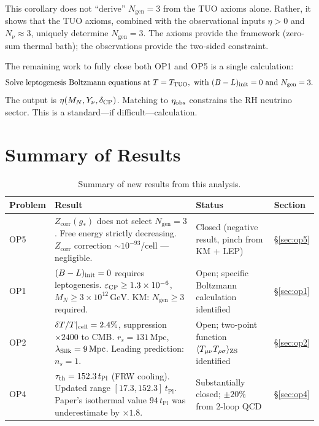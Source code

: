 \documentclass[12pt,a4paper]{article}
\theoremstyle{definition}
\newcommand{\tPl}{t_{\mathrm{Pl}}}
\newcommand{\TTUO}{T_{\mathrm{TUO}}}
\newcommand{\Ngen}{N_{\mathrm{gen}}}
\newcommand{\Zcorr}{Z_{\mathrm{corr}}}
\newcommand{\eps}{\varepsilon}
\begin{document}
This corollary does not ``derive'' $\Ngen = 3$ from the TUO axioms alone.
Rather, it shows that the TUO axioms, combined with the observational
inputs $\eta > 0$ and $N_\nu \approx 3$, uniquely determine $\Ngen = 3$.
The axioms provide the framework (zero-sum thermal bath); the observations
provide the two-sided constraint.

The remaining work to fully close both OP1 and OP5 is a single calculation:
\begin{equation}
  \text{Solve leptogenesis Boltzmann equations at } T = \TTUO,
  \text{ with } (B-L)_{\rm init} = 0 \text{ and } \Ngen = 3.
\end{equation}
The output is $\eta(M_N, Y_\nu, \delta_{\rm CP})$. Matching to $\eta_{\rm obs}$
constrains the RH neutrino sector. This is a standard---if difficult---calculation.

\section{Summary of Results}
\label{sec:summary}

\begin{table}[h]
\centering
\caption{Summary of new results from this analysis.}
\label{tab:summary}
\begin{tabular}{p{}p{}p{}l}
\toprule
Problem & Result & Status & Section \\
\midrule
OP5 &
$\Zcorr(g_*)$ does not select $\Ngen = 3$. Free energy strictly decreasing.
$\Zcorr$ correction $\sim 10^{-93}$/cell — negligible. &
Closed (negative result, pinch from KM + LEP) & \S\ref{sec:op5} \\[4pt]
OP1 &
$(B-L)_{\rm init} = 0$ requires leptogenesis.
$\eps_{\rm CP} \geq 1.3\times10^{-6}$, $M_N \geq 3\times10^{12}\,\mathrm{GeV}$.
KM: $\Ngen \geq 3$ required. &
Open; specific Boltzmann calculation identified & \S\ref{sec:op1} \\[4pt]
OP2 &
$\delta T/T|_{\rm cell} = 2.4\%$, suppression $\times 2400$ to CMB.
$r_s = 131\,\mathrm{Mpc}$, $\lambda_{\rm Silk} = 9\,\mathrm{Mpc}$.
Leading prediction: $n_s = 1$. &
Open; two-point function $\langle T_{\mu\nu}T_{\rho\sigma}\rangle_{\rm ZS}$ identified & \S\ref{sec:op2} \\[4pt]
OP4 &
$\tau_{\rm th} = 152.3\,\tPl$ (FRW cooling). Updated range $[17.3, 152.3]\,\tPl$.
Paper's isothermal value $94\,\tPl$ was underestimate by $\times 1.8$. &
Substantially closed; $\pm20\%$ from 2-loop QCD & \S\ref{sec:op4} \\
\bottomrule
\end{tabular}
\end{table}
\end{document}
